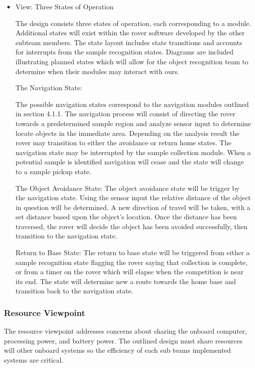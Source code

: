 \documentclass[10pt, oneside,onecolumn]{IEEEtran}
\begin{document}
\begin{itemize}
\item View: Three States of Operation

The design consists three states of operation, each corresponding to a module. Additional states will exist within the rover software developed by the other subteam members. The state layout includes state transitions and accounts for interrupts from the sample recognition states. Diagrams are included illustrating planned states which will allow for the object recognition team to determine when their modules may interact with ours. 

\subitem The Navigation State:

The possible navigation states correspond to the navigation modules outlined in section 4.1.1. The navigation process will consist of directing the rover towards a predetermined sample region and analyze sensor input to determine locate objects in the immediate area. Depending on the analysis result the rover may transition to either the avoidance or return home states. The navigation state may be interrupted by the sample collection module. When a potential sample is identified navigation will cease and the state will change to a sample pickup state. 

\subitem The Object Avoidance State: The object avoidance state will be trigger by the navigation state. Using the sensor input the relative distance of the object in question will be determined. A new direction of travel will be taken, with a set distance based upon the object's location. Once the distance has been traversed, the rover will decide the object has been avoided successfully, then transition to the navigation state.

\subitem Return to Base State: The return to base state will be triggered from either a sample recognition state flagging the rover saying that collection is complete, or from a timer on the rover which will elapse when the competition is near its end. The state will determine new a route towards the home base and transition back to the navigation state. 

\end{itemize}

\subsubsection{Resource Viewpoint}

The resource viewpoint addresses concerns about sharing the onboard computer, processing power, and battery power. The outlined design must share resources will other onboard systems so the efficiency of each sub teams implemented systems are critical.
\end{document}
